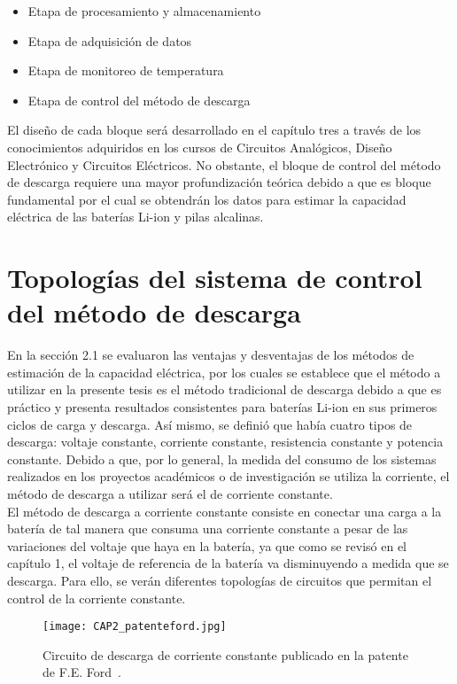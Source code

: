 \begin{itemize}
\item Etapa de procesamiento y almacenamiento
\item Etapa de adquisición de datos
\item Etapa de monitoreo de temperatura
\item Etapa de control del método de descarga
\end{itemize}

El diseño de cada bloque será desarrollado en el capítulo tres a través de los conocimientos adquiridos en los cursos de Circuitos Analógicos, Diseño Electrónico y Circuitos Eléctricos. No obstante, el bloque de control del método de descarga requiere una mayor profundización teórica debido a que es bloque fundamental por el cual se obtendrán los datos para estimar la capacidad eléctrica de las baterías Li-ion y pilas alcalinas. 

\section{Topologías del sistema de control del método de descarga}

En la sección 2.1 se evaluaron las ventajas y desventajas de los métodos de estimación de la capacidad eléctrica, por los cuales se establece que el método a utilizar en la presente tesis es el método tradicional de descarga debido a que es práctico y presenta resultados consistentes para baterías Li-ion en sus primeros ciclos de carga y descarga. Así mismo, se definió que había cuatro tipos de descarga: voltaje constante, corriente constante, resistencia constante y potencia constante. Debido a que, por lo general, la medida del consumo de los sistemas realizados en los proyectos académicos o de investigación se utiliza la corriente, el método de descarga a utilizar será el de corriente constante. \\

El método de descarga a corriente constante consiste en conectar una carga a la batería de tal manera que consuma una corriente constante a pesar de las variaciones del voltaje que haya en la batería, ya que como se revisó en el capítulo 1, el voltaje de referencia de la batería va disminuyendo a medida que se descarga. Para ello, se verán diferentes topologías de circuitos que permitan el control de la corriente constante. \\

\begin{figure}[!ht]
\begin{center}
\texttt{[image: CAP2\_patenteford.jpg]}
\caption{Circuito de descarga de corriente constante publicado en la patente de F.E. Ford~\cite{FordFloydE.1966}.}
\label{fig:patenteford}
\end{center}
\end{figure}

